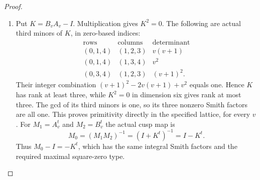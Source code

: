 \documentclass[11pt,a4paper]{article}
\theoremstyle{definition}
\begin{document}
\begin{proof}
\begin{enumerate}[label=\arabic*.]
The exact unit needed in the hatted lattice is
\[
 z=(-v^3+v-1,0,0,2,2(1-v^2))^t.
\]
Writing $a=-v^3+v-1$, the first coordinate of $Y'z$ is
$-2a-2+2v(1-v^2)=0$. Half its second coordinate is
$(1-v)a+(v^2-v)+q(1-v^2)=0$, since the first two terms
sum to $v^4-v^3+v-1$ and the last is its negative. Furthermore
\[
 \beta z=s(v^3-v-1)+2v^2r=1.
 \tag{F.U5}\label{maps:eq:F.U5}
\]
Indeed the two summands expand to
$v^5+v^4-2v^3-2v^2+1$ and
$-v^5-v^4+2v^3+2v^2$.
Since $AB=I-N$ and $NPz=X(Y'z)=0$, the actual six-dimensional
map satisfies
\[
 (\widehat A\widehat B-I)(0,z)^t=e_0.
\]
This establishes the unit in the displayed hatted coordinates.

The row identity
$\beta(I+B'+B'^2+B'^3)=0$ proves
$\widehat B^4=I$; also $\widehat A^5=I$. Their quotient actions
show that these orders are exact.

Use the specified lattice change
\[
 L=\frac14\begin{pmatrix}
 -2&3&-5&-1&5&-3\\
 0&2&-2&2&-2&2\\
 0&-4&0&0&4&-4\\
 0&0&0&-4&4&-4\\
 0&0&4&-4&4&-4\\
 0&0&0&-4&4&0
 \end{pmatrix},\qquad
 A_v=L^{-1}\widehat A L,\quad B_v=L^{-1}\widehat B L.
 \tag{F.U6}\label{maps:eq:F.U6}
\]
Here $\det L=-1/4$. Expanding these products gives entries in
$\mathbb Z[v]$ for both matrices. The complete expanded entries
and the exact identities
$LA_v=\widehat A L$, $LB_v=\widehat B L$ are supplied by the
polynomial certificate described in the last item. Thus the
defined matrices act on the stated $\mathbb Z^6$ for every integer
parameter. Their determinants are one and their inverses are
the integer powers $A_v^4,B_v^3$. Their characteristic polynomials are
\[
 (x-1)^2\Phi_5(x),\qquad (x-1)^2(x+1)^2(x^2+1),
\]
respectively.

\item Put $K=B_vA_v-I$. Multiplication gives $K^2=0$.
The following are actual third minors of $K$, in zero-based indices:
\[
 \begin{array}{c|c|c}
 \text{rows}&\text{columns}&\text{determinant}\\\hline
 (0,1,4)&(1,2,3)&v(v+1)\\
 (0,1,4)&(1,3,4)&v^2\\
 (0,3,4)&(1,2,3)&(v+1)^2.
 \end{array}
\]
Their integer combination $(v+1)^2-2v(v+1)+v^2$ equals one.
Hence $K$ has rank at least three, while $K^2=0$ in dimension six
gives rank at most three. The gcd of its third minors is one,
so its three nonzero Smith factors are all one. This proves
primitivity directly in the specified lattice, for every $v$.
For $M_1=A_v^t$ and $M_2=B_v^t$ the actual cusp map is
\[
 M_0=(M_1M_2)^{-1}=(I+K^t)^{-1}=I-K^t.
\]
Thus $M_0-I=-K^t$, which has the same integral Smith factors
and the required maximal square-zero type.


\end{enumerate}
\end{proof}
\end{document}
